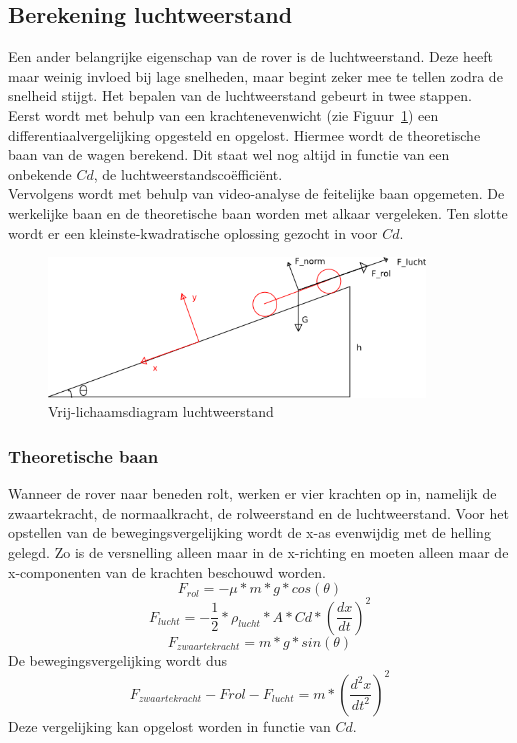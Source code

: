 \subsection{Berekening luchtweerstand}
\label{bijlage:luchtweerstand}
Een ander belangrijke eigenschap van de rover is de luchtweerstand. Deze heeft maar weinig invloed bij lage snelheden, maar begint zeker mee te tellen zodra de snelheid stijgt. Het bepalen van de luchtweerstand gebeurt in twee stappen.\\
Eerst wordt met behulp van een krachtenevenwicht (zie Figuur~\ref{image:luchtweerstand}) een differentiaalvergelijking opgesteld en opgelost. Hiermee wordt de theoretische baan van de wagen berekend. Dit staat wel nog altijd in functie van een onbekende $Cd$, de luchtweerstandsco\"effici\"ent.\\
Vervolgens wordt met behulp van video-analyse de feitelijke baan opgemeten. De werkelijke baan en de theoretische baan worden met alkaar vergeleken. Ten slotte wordt er een kleinste-kwadratische oplossing gezocht in voor $Cd$.\\
\begin{figure}[here]
\includegraphics[width=10cm]{bijlagen/luchtweerstand/luchtweerstand.png}
\caption{Vrij-lichaamsdiagram luchtweerstand}
\label{image:luchtweerstand}
\end{figure}
\subsubsection{Theoretische baan}

Wanneer de rover naar beneden rolt, werken er vier krachten op in, namelijk de zwaartekracht, de normaalkracht, de rolweerstand en de luchtweerstand. Voor het opstellen van de bewegingsvergelijking wordt de x-as evenwijdig met de helling gelegd. Zo is de versnelling alleen maar in de x-richting en moeten alleen maar de x-componenten van de krachten beschouwd worden.
\begin{equation} \label{eq:rolweerstand}
F_{rol}=-\mu*m*g*cos(\theta)
\end{equation}
\begin{equation} \label{eq:luchtweerstand}
F_{lucht}=-\frac{1}{2}*\rho_{lucht}*A*Cd*\left(\frac{dx}{dt}\right)^2
\end{equation}
\begin{equation} \label{eq:zwaartekracht}
F_{zwaartekracht}=m*g*sin(\theta)
\end{equation}
De bewegingsvergelijking wordt dus
\begin{equation}
F_{zwaartekracht} - F{rol}-F_{lucht}=m*\left(\frac{d^2x}{dt^2}\right)^2
\end{equation}
Deze vergelijking kan opgelost worden in functie van $Cd$.
